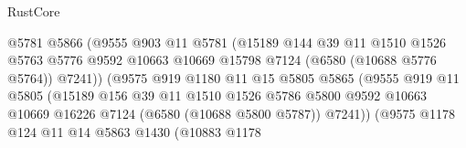 \begin{lexlean}{RustCore}
\begin{coremodule}
                                    @5781
                                    @5866
                                    (@9555
                                      @903
                                      @11
                                      @5781
                                      (@15189
                                        @144
                                        @39
                                        @11
                                        @1510
                                        @1526
                                        @5763
                                        @5776
                                        @9592
                                        @10663
                                        @10669
                                        @15798
                                        @7124
                                        (@6580 (@10688 @5776 @5764))
                                        @7241))
                                    (@9575
                                      @919
                                      @1180
                                      @11
                                      @15
                                      @5805
                                      @5865
                                      (@9555
                                        @919
                                        @11
                                        @5805
                                        (@15189
                                          @156
                                          @39
                                          @11
                                          @1510
                                          @1526
                                          @5786
                                          @5800
                                          @9592
                                          @10663
                                          @10669
                                          @16226
                                          @7124
                                          (@6580 (@10688 @5800 @5787))
                                          @7241))
                                      (@9575
                                        @1178
                                        @124
                                        @11
                                        @14
                                        @5863
                                        @1430
                                        (@10883
                                          @1178

\end{coremodule}
\end{lexlean}
